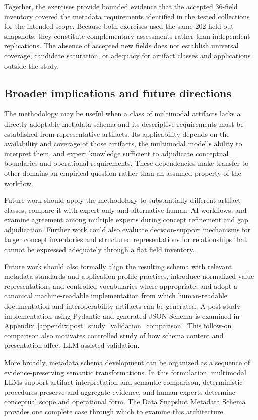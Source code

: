 \documentclass{article}
\begin{document}
Together, the exercises provide bounded evidence that the accepted 36-field inventory covered the metadata requirements identified in the tested collections for the intended scope. Because both exercises used the same 202 held-out snapshots, they constitute complementary assessments rather than independent replications. The absence of accepted new fields does not establish universal coverage, candidate saturation, or adequacy for artifact classes and applications outside the study.

\subsection{Broader implications and future directions}

The methodology may be useful when a class of multimodal artifacts lacks a directly adoptable metadata schema and its descriptive requirements must be established from representative artifacts. Its applicability depends on the availability and coverage of those artifacts, the multimodal model's ability to interpret them, and expert knowledge sufficient to adjudicate conceptual boundaries and operational requirements. These dependencies make transfer to other domains an empirical question rather than an assumed property of the workflow.

Future work should apply the methodology to substantially different artifact classes, compare it with expert-only and alternative human--AI workflows, and examine agreement among multiple experts during concept refinement and gap adjudication. Further work could also evaluate decision-support mechanisms for larger concept inventories and structured representations for relationships that cannot be expressed adequately through a flat field inventory.

Future work should also formally align the resulting schema with relevant metadata standards and application-profile practices, introduce normalized value representations and controlled vocabularies where appropriate, and adopt a canonical machine-readable implementation from which human-readable documentation and interoperability artifacts can be generated. A post-study implementation using Pydantic and generated JSON Schema is examined in Appendix~\ref{appendix:post_study_validation_comparison}. This follow-on comparison also motivates controlled study of how schema content and presentation affect LLM-assisted validation.

More broadly, metadata schema development can be organized as a sequence of evidence-preserving semantic transformations. In this formulation, multimodal LLMs support artifact interpretation and semantic comparison, deterministic procedures preserve and aggregate evidence, and human experts determine conceptual scope and operational form. The Data Snapshot Metadata Schema provides one complete case through which to examine this architecture.
\end{document}
